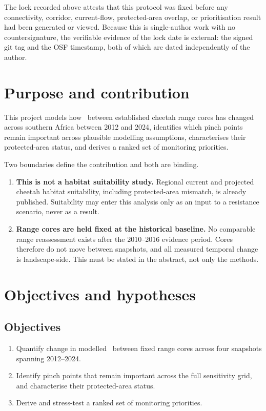 \vspace{8pt}
\noindent The lock recorded above attests that this protocol was fixed before any
connectivity, corridor, current-flow, protected-area overlap, or prioritisation
result had been generated or viewed. Because this is single-author work with no
countersignature, the verifiable evidence of the lock date is external: the
signed git tag and the OSF timestamp, both of which are dated independently of
the author.

\section{Purpose and contribution}

This project models how \structconn\ between established cheetah range cores has
changed across southern Africa between 2012 and 2024, identifies which pinch
points remain important across plausible modelling assumptions, characterises
their protected-area status, and derives a ranked set of monitoring priorities.

Two boundaries define the contribution and both are binding.

\begin{enumerate}[leftmargin=*]
\item \textbf{This is not a habitat suitability study.} Regional current and
projected cheetah habitat suitability, including protected-area mismatch, is
already published. Suitability may enter this analysis only as an input to a
resistance scenario, never as a result.
\item \textbf{Range cores are held fixed at the historical baseline.} No
comparable range reassessment exists after the 2010--2016 evidence period.
Cores therefore do not move between snapshots, and all measured temporal change
is landscape-side. This must be stated in the abstract, not only the methods.
\end{enumerate}

\section{Objectives and hypotheses}

\subsection{Objectives}
\begin{enumerate}[leftmargin=*,label=O\arabic*.]
\item Quantify change in modelled \structconn\ between fixed range cores across
four snapshots spanning 2012--2024.
\item Identify pinch points that remain important across the full sensitivity
grid, and characterise their protected-area status.
\item Derive and stress-test a ranked set of monitoring priorities.
\end{enumerate}

